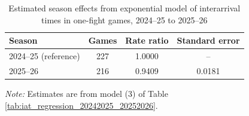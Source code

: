 \begin{table}[!h]
\centering
\caption{Estimated season effects from exponential model of interarrival times in one-fight games, 2024--25 to 2025--26}
\label{tab:season_effects_20242025_20252026}
\small
\renewcommand{\arraystretch}{1.12}
\setlength{\tabcolsep}{6pt}

\begin{tabular*}{0.75\textwidth}{@{\extracolsep{\fill}}lccc}
\toprule
Season & Games & Rate ratio & Standard error \\
\midrule
2024--25 (reference) & 227 & 1.0000 & -- \\
2025--26 & 216 & 0.9409 & 0.0181 \\
\bottomrule
\end{tabular*}

\vspace{0.4em}
\parbox{0.75\textwidth}{
\footnotesize
\textit{Note:} Estimates are from model (3) of Table \ref{tab:iat_regression_20242025_20252026}.
}
\end{table}
